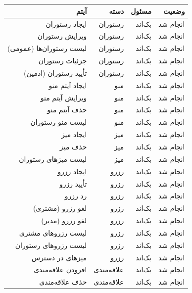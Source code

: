 \documentclass[12pt, a4paper]{article}
\begin{document}
\newpage

\section{}

\begin{longtable}{|r|r|r|r|}
\hline
\textbf{آیتم} & \textbf{دسته} & \textbf{مسئول} & \textbf{وضعیت} \\
\hline
\endhead
ایجاد رستوران & رستوران & بک‌اند & انجام شد \\
\hline
ویرایش رستوران & رستوران & بک‌اند & انجام شد \\
\hline
لیست رستوران‌ها (عمومی) & رستوران & بک‌اند & انجام شد \\
\hline
جزئیات رستوران & رستوران & بک‌اند & انجام شد \\
\hline
تأیید رستوران (ادمین) & رستوران & بک‌اند & انجام شد \\
\hline
ایجاد آیتم منو & منو & بک‌اند & انجام شد \\
\hline
ویرایش آیتم منو & منو & بک‌اند & انجام شد \\
\hline
حذف آیتم منو & منو & بک‌اند & انجام شد \\
\hline
لیست منو رستوران & منو & بک‌اند & انجام شد \\
\hline
ایجاد میز & میز & بک‌اند & انجام شد \\
\hline
حذف میز & میز & بک‌اند & انجام شد \\
\hline
لیست میزهای رستوران & میز & بک‌اند & انجام شد \\
\hline
ایجاد رزرو & رزرو & بک‌اند & انجام شد \\
\hline
تأیید رزرو & رزرو & بک‌اند & انجام شد \\
\hline
رد رزرو & رزرو & بک‌اند & انجام شد \\
\hline
لغو رزرو (مشتری) & رزرو & بک‌اند & انجام شد \\
\hline
لغو رزرو (مدیر) & رزرو & بک‌اند & انجام شد \\
\hline
لیست رزروهای مشتری & رزرو & بک‌اند & انجام شد \\
\hline
لیست رزروهای رستوران & رزرو & بک‌اند & انجام شد \\
\hline
میزهای در دسترس & رزرو & بک‌اند & انجام شد \\
\hline
افزودن علاقه‌مندی & علاقه‌مندی & بک‌اند & انجام شد \\
\hline
حذف علاقه‌مندی & علاقه‌مندی & بک‌اند & انجام شد \\

\end{longtable}
\end{document}
